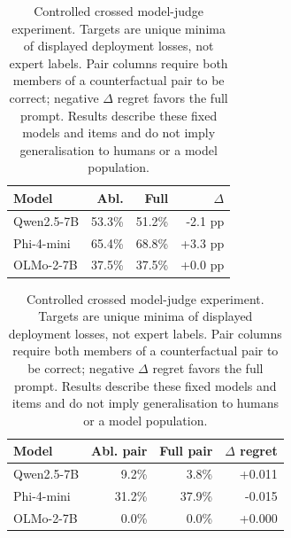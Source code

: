 \begin{table}[t]
\centering\footnotesize
\setlength{\tabcolsep}{4pt}
\begin{tabular}{lrrr}
\toprule
Model & Abl. & Full & $\Delta$ \\
\midrule
Qwen2.5-7B & 53.3\% & 51.2\% & -2.1 pp \\
Phi-4-mini & 65.4\% & 68.8\% & +3.3 pp \\
OLMo-2-7B & 37.5\% & 37.5\% & +0.0 pp \\
\bottomrule
\end{tabular}
\vspace{3pt}
\begin{tabular}{lrrr}
\toprule
Model & Abl. pair & Full pair & $\Delta$ regret \\
\midrule
Qwen2.5-7B & 9.2\% & 3.8\% & +0.011 \\
Phi-4-mini & 31.2\% & 37.9\% & -0.015 \\
OLMo-2-7B & 0.0\% & 0.0\% & +0.000 \\
\bottomrule
\end{tabular}
\caption{Controlled crossed model-judge experiment. Targets are unique minima of displayed deployment losses, not expert labels. Pair columns require both members of a counterfactual pair to be correct; negative $\Delta$ regret favors the full prompt. Results describe these fixed models and items and do not imply generalisation to humans or a model population.}
\label{tab:controlled-model-judges}
\end{table}
